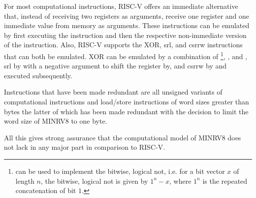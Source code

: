 For most computational instructions, RISC-V offers an immediate alternative that, instead of receiving two registers as arguments, receive one register and one immediate value from memory as arguments.
These instructions can be emulated by first executing the  instruction and then the respective non-immediate version of the instruction.
Also, RISC-V supports the XOR, \gls{srl}, and \gls{csrrw} instructions that can both be emulated.
XOR can be emulated by a combination of \footnote{%
     can be used to implement the bitwise, logical not, i.e. for a bit vector $ x $ of length $ n $, the bitwise, logical not is given by $ 1^n - x $, where $ 1^n $ is the repeated concatenation of bit $ 1 $.
}, , and , \gls{srl} by  with a negative argument to shift the register by, and \gls{csrrw} by  and  executed subsequently.

Instructions that have been made redundant are all unsigned variants of computational instructions and load/store instructions of word sizes greater than bytes the latter of which has been made redundant with the decision to limit the word size of MINRV8 to one byte.

All this gives strong assurance that the computational model of MINRV8 does not lack in any major part in comparison to RISC-V.


